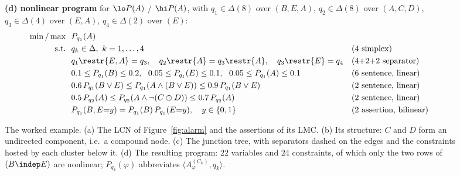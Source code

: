 \begin{figure}[t]

\vspace{4pt}
\small
\begin{minipage}{0.98\linewidth}
\textbf{(d) nonlinear program} for $\lo P(A)$ / $\hi P(A)$, with
$q_1\in\Delta(8)$ over $(B,E,A)$, $q_2\in\Delta(8)$ over $(A,C,D)$,
$q_3\in\Delta(4)$ over $(E,A)$, $q_4\in\Delta(2)$ over $(E)$:
\[
\begin{aligned}
\min/\max\ \ & P_{q_1}(A)\\
\text{s.t.}\ \ & q_k\in\Delta,\ k=1,\dots,4
  && \text{(4 simplex)}\\
& q_1\restr\{E,A\}=q_3,\quad q_2\restr\{A\}=q_3\restr\{A\},\quad
  q_3\restr\{E\}=q_4
  && \text{(4+2+2 separator)}\\
& 0.1\le P_{q_1}(B)\le0.2,\ \ 0.05\le P_{q_1}(E)\le0.1,\ \
  0.05\le P_{q_1}(A)\le0.1
  && \text{(6 sentence, linear)}\\
& 0.6\,P_{q_1}(B\vee E)\le P_{q_1}(A\wedge(B\vee E))\le0.9\,P_{q_1}(B\vee E)
  && \text{(2 sentence, linear)}\\
& 0.5\,P_{q_2}(A)\le P_{q_2}(A\wedge\lnot(C\oplus D))\le0.7\,P_{q_2}(A)
  && \text{(2 sentence, linear)}\\
& P_{q_1}(B,E{=}y)=P_{q_1}(B)\,P_{q_1}(E{=}y),\quad y\in\{0,1\}
  && \text{(2 assertion, bilinear)}
\end{aligned}
\]
\end{minipage}
\caption{The worked example. (a) The LCN of Figure~\ref{fig:alarm} and the
assertions of its LMC. (b) Its structure: $C$ and $D$ form an undirected
component, i.e.\ a compound node. (c) The junction tree, with separators dashed
on the edges and the constraints hosted by each cluster below it. (d) The
resulting program: $22$ variables and $24$ constraints, of which only the two
rows of $(B\indep E)$ are nonlinear; $P_{q_k}(\varphi)$ abbreviates
$\langle A^{(C_k)}_\varphi,q_k\rangle$.}
\label{fig:cjt-example}
\end{figure}

